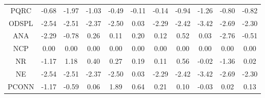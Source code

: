 \documentclass[11pt,a4paper]{report}
\begin{document}
\begin{longtable}{ | c || c | c | c | c | c | c | c | c | c || c |}
PQRC &  \cellcolor[HTML]{FFEFEF} -0.68 &  \cellcolor[HTML]{FFCFCF} -1.97 &  \cellcolor[HTML]{FFE7E7} -1.03 &  \cellcolor[HTML]{FFEFEF} -0.49 &  \cellcolor[HTML]{FFFFFF} -0.11 &  \cellcolor[HTML]{FFFFFF} -0.14 &  \cellcolor[HTML]{FFE7E7} -0.94 &  \cellcolor[HTML]{FFDFDF} -1.26 &  \cellcolor[HTML]{FFE7E7} -0.80 &  \cellcolor[HTML]{FFE7E7} -0.82 \\
ODSPL &  \cellcolor[HTML]{FFBFBF} -2.54 &  \cellcolor[HTML]{FFBFBF} -2.51 &  \cellcolor[HTML]{FFC7C7} -2.37 &  \cellcolor[HTML]{FFBFBF} -2.50 &  \cellcolor[HTML]{FFFFFF} 0.03 &  \cellcolor[HTML]{FFC7C7} -2.29 &  \cellcolor[HTML]{FFBFBF} -2.42 &  \cellcolor[HTML]{FFA7A7} -3.42 &  \cellcolor[HTML]{FFBFBF} -2.69 &  \cellcolor[HTML]{FFC7C7} -2.30 \\
ANA &  \cellcolor[HTML]{FFC7C7} -2.29 &  \cellcolor[HTML]{FFEFEF} -0.78 &  \cellcolor[HTML]{F7F7FF} 0.26 &  \cellcolor[HTML]{FFFFFF} 0.11 &  \cellcolor[HTML]{F7F7FF} 0.20 &  \cellcolor[HTML]{FFFFFF} 0.12 &  \cellcolor[HTML]{EFEFFF} 0.52 &  \cellcolor[HTML]{FFFFFF} 0.03 &  \cellcolor[HTML]{FFB7B7} -2.76 &  \cellcolor[HTML]{FFEFEF} -0.51 \\
NCP &  \cellcolor[HTML]{FFFFFF} 0.00 &  \cellcolor[HTML]{FFFFFF} 0.00 &  \cellcolor[HTML]{FFFFFF} 0.00 &  \cellcolor[HTML]{FFFFFF} 0.00 &  \cellcolor[HTML]{FFFFFF} 0.00 &  \cellcolor[HTML]{FFFFFF} 0.00 &  \cellcolor[HTML]{FFFFFF} 0.00 &  \cellcolor[HTML]{FFFFFF} 0.00 &  \cellcolor[HTML]{FFFFFF} 0.00 &  \cellcolor[HTML]{FFFFFF} 0.00 \\
NR &  \cellcolor[HTML]{FFDFDF} -1.17 &  \cellcolor[HTML]{DFDFFF} 1.18 &  \cellcolor[HTML]{F7F7FF} 0.40 &  \cellcolor[HTML]{F7F7FF} 0.27 &  \cellcolor[HTML]{F7F7FF} 0.19 &  \cellcolor[HTML]{FFFFFF} 0.11 &  \cellcolor[HTML]{EFEFFF} 0.56 &  \cellcolor[HTML]{FFFFFF} -0.02 &  \cellcolor[HTML]{FFDFDF} -1.36 &  \cellcolor[HTML]{FFFFFF} 0.02 \\
NE &  \cellcolor[HTML]{FFBFBF} -2.54 &  \cellcolor[HTML]{FFBFBF} -2.51 &  \cellcolor[HTML]{FFC7C7} -2.37 &  \cellcolor[HTML]{FFBFBF} -2.50 &  \cellcolor[HTML]{FFFFFF} 0.03 &  \cellcolor[HTML]{FFC7C7} -2.29 &  \cellcolor[HTML]{FFBFBF} -2.42 &  \cellcolor[HTML]{FFA7A7} -3.42 &  \cellcolor[HTML]{FFBFBF} -2.69 &  \cellcolor[HTML]{FFC7C7} -2.30 \\
PCONN &  \cellcolor[HTML]{FFDFDF} -1.17 &  \cellcolor[HTML]{FFEFEF} -0.59 &  \cellcolor[HTML]{FFFFFF} 0.06 &  \cellcolor[HTML]{CFCFFF} 1.89 &  \cellcolor[HTML]{EFEFFF} 0.64 &  \cellcolor[HTML]{F7F7FF} 0.21 &  \cellcolor[HTML]{FFFFFF} 0.10 &  \cellcolor[HTML]{FFFFFF} -0.03 &  \cellcolor[HTML]{FFFFFF} 0.02 &  \cellcolor[HTML]{FFFFFF} 0.13 \\

\end{longtable}
\end{document}
